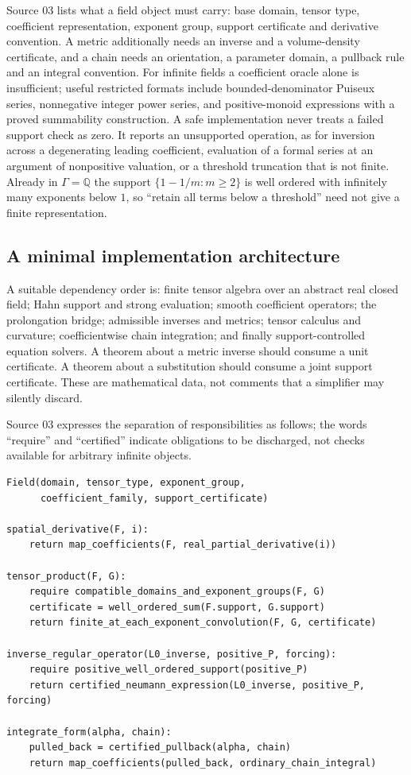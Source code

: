 \documentclass[11pt,letterpaper]{article}
\theoremstyle{definition}
\theoremstyle{remark}
\newcommand{\Q}{\mathbb Q}\newcommand{\N}{\mathbb N}\newcommand{\Z}{\mathbb Z}
\begin{document}
Source 03 lists what a field object must carry: base domain, tensor type,
coefficient representation, exponent group, support certificate and derivative
convention. A metric additionally needs an inverse and a volume-density
certificate, and a chain needs an orientation, a parameter domain, a pullback
rule and an integral convention. For infinite fields a coefficient oracle alone
is insufficient; useful restricted formats include bounded-denominator Puiseux
series, nonnegative integer power series, and positive-monoid expressions with a
proved summability construction. A safe implementation never treats a failed
support check as zero. It reports an unsupported operation, as for inversion
across a degenerating leading coefficient, evaluation of a formal series at an
argument of nonpositive valuation, or a threshold truncation that is not finite.
Already in $\Gamma=\Q$ the support $\{1-1/m:m\ge2\}$ is well ordered with
infinitely many exponents below $1$, so ``retain all terms below a threshold''
need not give a finite representation.

\subsection{A minimal implementation architecture}

A suitable dependency order is: finite tensor algebra over an abstract real
closed field; Hahn support and strong evaluation; smooth coefficient
operators; the prolongation bridge; admissible inverses and metrics; tensor
calculus and curvature; coefficientwise chain integration; and finally
support-controlled equation solvers. A theorem about a metric inverse should
consume a unit certificate. A theorem about a substitution should consume a
joint support certificate. These are mathematical data, not comments that a
simplifier may silently discard.

Source 03 expresses the separation of responsibilities as follows; the words
``require'' and ``certified'' indicate obligations to be discharged, not checks
available for arbitrary infinite objects.

\begin{lstlisting}
Field(domain, tensor_type, exponent_group,
      coefficient_family, support_certificate)

spatial_derivative(F, i):
    return map_coefficients(F, real_partial_derivative(i))

tensor_product(F, G):
    require compatible_domains_and_exponent_groups(F, G)
    certificate = well_ordered_sum(F.support, G.support)
    return finite_at_each_exponent_convolution(F, G, certificate)

inverse_regular_operator(L0_inverse, positive_P, forcing):
    require positive_well_ordered_support(positive_P)
    return certified_neumann_expression(L0_inverse, positive_P, forcing)

integrate_form(alpha, chain):
    pulled_back = certified_pullback(alpha, chain)
    return map_coefficients(pulled_back, ordinary_chain_integral)
\end{lstlisting}
\end{document}
